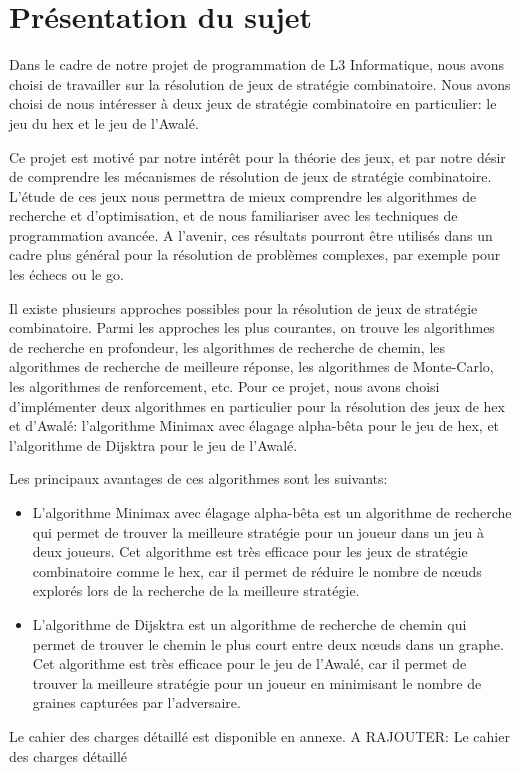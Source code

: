 \section{Présentation du sujet}
Dans le cadre de notre projet de programmation de L3 Informatique, nous avons
choisi de travailler sur la résolution de jeux de stratégie combinatoire.
Nous avons choisi de nous intéresser à deux jeux de stratégie combinatoire en
particulier: le jeu du hex et le jeu de l'Awalé.

Ce projet est motivé par notre intérêt pour la théorie des jeux, et par notre 
désir de comprendre les mécanismes de résolution de jeux de stratégie 
combinatoire.
L'étude de ces jeux nous permettra de mieux comprendre les algorithmes de 
recherche et d'optimisation, et de nous familiariser avec les techniques de 
programmation avancée. A l'avenir, ces résultats pourront être utilisés dans
un cadre plus général pour la résolution de problèmes complexes, par exemple
pour les échecs ou le go.

Il existe plusieurs approches possibles pour la résolution de jeux de stratégie
combinatoire. Parmi les approches les plus courantes, on trouve les algorithmes
de recherche en profondeur, les algorithmes de recherche de chemin, les
algorithmes de recherche de meilleure réponse, les algorithmes de Monte-Carlo,
les algorithmes de renforcement, etc.
Pour ce projet, nous avons choisi d'implémenter deux algorithmes en particulier
pour la résolution des jeux de hex et d'Awalé: l'algorithme Minimax avec élagage
alpha-bêta pour le jeu de hex, et l'algorithme de Dijsktra pour le jeu de l'Awalé.

Les principaux avantages de ces algorithmes sont les suivants:
\begin{itemize}
	\item L'algorithme Minimax avec élagage alpha-bêta est un algorithme de recherche
	qui permet de trouver la meilleure stratégie pour un joueur dans un jeu à deux
	joueurs. Cet algorithme est très efficace pour les jeux de stratégie combinatoire
	comme le hex, car il permet de réduire le nombre de nœuds explorés lors de la
	recherche de la meilleure stratégie.
	\item L'algorithme de Dijsktra est un algorithme de recherche de chemin qui permet
	de trouver le chemin le plus court entre deux nœuds dans un graphe. Cet algorithme
	est très efficace pour le jeu de l'Awalé, car il permet de trouver la meilleure
	stratégie pour un joueur en minimisant le nombre de graines capturées par l'adversaire.
\end{itemize}

Le cahier des charges détaillé est disponible en annexe.
A RAJOUTER\@: Le cahier des charges détaillé